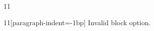 \documentclass[paper=A4]{ropas-poster}
\begin{document}
\begin{postergrid}{1}{1}
\begin{posterblock}{1}{1}[paragraph-indent=-1bp]
Invalid block option.
\end{posterblock}
\end{postergrid}
\end{document}
